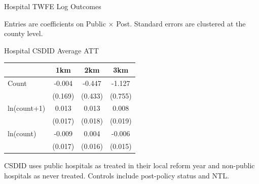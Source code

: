 \documentclass{beamer}
\begin{document}
\begin{frame}{Hospital TWFE Log Outcomes}

\centering
\scriptsize
\setlength{\tabcolsep}{3pt}


\vspace{0.4em}
\raggedright
\tiny Entries are coefficients on Public $\times$ Post. Standard errors are clustered at the county level.

\end{frame}

\begin{frame}{Hospital CSDID Average ATT}

\centering
\scriptsize
\setlength{\tabcolsep}{5pt}

\begin{tabular}{lccc}
\toprule
& 1km & 2km & 3km \\
\midrule
Count
& -0.004 & -0.447 & -1.127 \\
& (0.169) & (0.433) & (0.755) \\
\addlinespace
ln(count+1)
& 0.013 & 0.013 & 0.008 \\
& (0.017) & (0.018) & (0.019) \\
\addlinespace
ln(count)
& -0.009 & 0.004 & -0.006 \\
& (0.017) & (0.016) & (0.015) \\
\bottomrule
\end{tabular}

\vspace{0.5em}
\raggedright
\tiny CSDID uses public hospitals as treated in their local reform year and non-public hospitals as never treated. Controls include post-policy status and NTL.

\end{frame}
\end{document}
